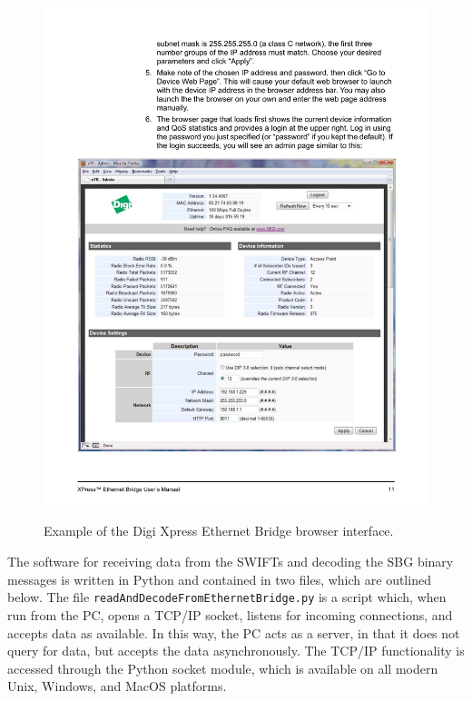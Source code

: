 \documentclass[11pt]{amsart}
\begin{document}
\begin{figure}[t]
    \centering
    \noindent\includegraphics[width=5.5in]{XpressBrowserInterface.pdf}\\
   \vspace{-0in}\caption{Example of the Digi Xpress Ethernet Bridge browser interface.}\label{fig:XpressBrowserInterface}
\end{figure}


The software for receiving data from the SWIFTs and decoding the SBG binary messages is written in Python and contained in two files, which are outlined below. The file \texttt{readAndDecodeFromEthernetBridge.py} is a script which, when run from the PC, opens a TCP/IP socket, listens for incoming connections, and accepts data as available.  In this way, the PC acts as a server, in that it does not query for data, but accepts the data asynchronously.  The TCP/IP functionality is accessed through the Python socket module, which is available on all modern Unix, Windows, and MacOS platforms.  
\end{document}
